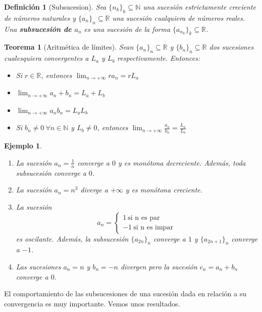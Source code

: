 \documentclass{article}
\newtheorem{theorem}{Teorema}
\newtheorem{define}{Definición}
\newtheorem{ejem}{Ejemplo}
\begin{document}
\begin{define}[Subsucesion]
	Sea $\{ n_k\}_k \subseteq \mathbb{N}$ una sucesión estrictamente creciente de números naturales y $\{ a_n\}_n \subseteq \mathbb{R}$ una sucesión cualquiera de números reales.
	Una \textbf{subsucesión de $a_n$} es una sucesión de la forma $\{ a_{n_k}\}_k \subseteq \mathbb{R}$.
\end{define}

\begin{theorem}[Aritmética de límites]
	Sean $\{ a_n\}_n \subseteq \mathbb{R}$ y $\{ b_n\}_n \subseteq \mathbb{R}$ dos sucesiones cualesquiera convergentes a $L_a$ y $L_b$ respectivamente. Entonces:
	\begin{itemize}
		\item
		Si $r \in \mathbb{R}$, entonces $\lim_{n\rightarrow +\infty} ra_n = rL_a$
		\item
		$\lim_{n\rightarrow +\infty} a_n + b_n = L_a + L_b$
		\item
		$\lim_{n\rightarrow +\infty} a_nb_n = L_aL_b$
		\item
		Si $b_n \neq 0\ \forall n \in \mathbb{N}$ y $L_b \not= 0$, entonces $\lim_{n\rightarrow +\infty} \frac{a_n}{b_n} = \frac{L_a}{L_b}$
	\end{itemize}
\end{theorem}


\begin{ejem}
\begin{enumerate}
\item
La sucesión $a_n = \frac{1}{n}$ converge a $0$ y es monótona decreciente. Además, toda subsucesión converge a $0$.
\item
La sucesión $a_n = n^3$ diverge a $+\infty$ y es monótona creciente.
\item
La sucesión 
\begin{equation}
a_n = \left\lbrace
\begin{array}{l}
1\ \text{si n es par}\\ 
-1\ \text{si n es impar}\
\end{array}
\right.
\end{equation}
es oscilante. Además, la subsucesión $\{a_{2n} \}_n$ converge a $1$ y $\{a_{2n+1} \}_n$ converge a $-1$.
\item
Las sucesiones $a_n = n$ y $b_n = -n$ divergen pero la sucesión $c_n = a_n + b_n$ converge a $0$.
\end{enumerate}
\end{ejem}

El comportamiento de las subsucesiones de una sucesión dada en relación a su convergencia es muy importante. Vemos unos resultados.
\end{document}
